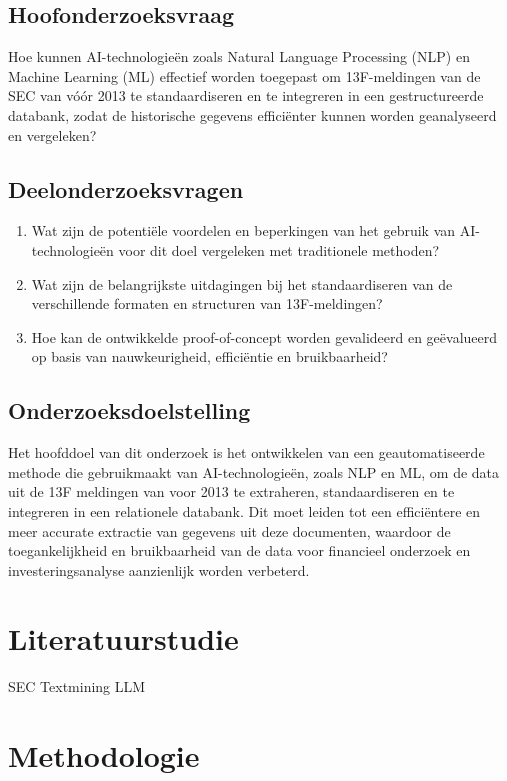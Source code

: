 \subsection{Hoofonderzoeksvraag}

Hoe kunnen AI-technologieën zoals Natural Language Processing (NLP) en Machine Learning (ML) effectief worden toegepast om 13F-meldingen van de SEC van vóór 2013 te standaardiseren en te integreren in een gestructureerde databank, zodat de historische gegevens efficiënter kunnen worden geanalyseerd en vergeleken?

\subsection{Deelonderzoeksvragen}
\begin{enumerate}
    \item Wat zijn de potentiële voordelen en beperkingen van het gebruik van AI-technologieën voor dit doel vergeleken met traditionele methoden?
    \item Wat zijn de belangrijkste uitdagingen bij het standaardiseren van de verschillende formaten en structuren van 13F-meldingen?
    \item Hoe kan de ontwikkelde proof-of-concept worden gevalideerd en geëvalueerd op basis van nauwkeurigheid, efficiëntie en bruikbaarheid?
\end{enumerate}



\subsection{Onderzoeksdoelstelling}
Het hoofddoel van dit onderzoek is het ontwikkelen van een geautomatiseerde methode die gebruikmaakt van AI-technologieën, zoals NLP en ML, om de data uit de 13F meldingen van voor 2013 te extraheren, standaardiseren en te integreren in een relationele databank. Dit moet leiden tot een efficiëntere en meer accurate extractie van gegevens uit deze documenten, waardoor de toegankelijkheid en bruikbaarheid van de data voor financieel onderzoek en investeringsanalyse aanzienlijk worden verbeterd. 



\section{Literatuurstudie}%
\label{sec:literatuurstudie}
SEC
Textmining
LLM

\section{Methodologie}
\label{sec:methodologie}


